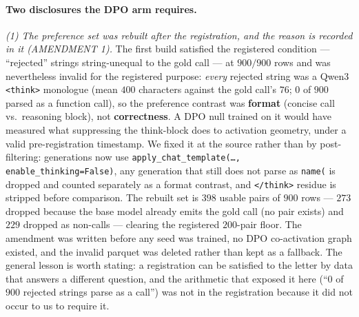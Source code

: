 \documentclass{article}
\begin{document}
\paragraph{Two disclosures the DPO arm requires.} \emph{(1) The preference set was rebuilt after the registration, and the reason is recorded in it (AMENDMENT 1).} The first build satisfied the registered condition --- ``rejected'' strings string-unequal to the gold call --- at $900/900$ rows and was nevertheless invalid for the registered purpose: \emph{every} rejected string was a Qwen3 \texttt{<think>} monologue (mean $400$ characters against the gold call's $76$; $0$ of $900$ parsed as a function call), so the preference contrast was \textbf{format} (concise call vs.\ reasoning block), not \textbf{correctness}. A DPO null trained on it would have measured what suppressing the think-block does to activation geometry, under a valid pre-registration timestamp. We fixed it at the source rather than by post-filtering: generations now use \texttt{apply\_chat\_template(\ldots, enable\_thinking=False)}, any generation that still does not parse as \texttt{name(} is dropped and counted separately as a format contrast, and \texttt{</think>} residue is stripped before comparison. The rebuilt set is $398$ usable pairs of $900$ rows --- $273$ dropped because the base model already emits the gold call (no pair exists) and $229$ dropped as non-calls --- clearing the registered $200$-pair floor. The amendment was written before any seed was trained, no DPO co-activation graph existed, and the invalid parquet was deleted rather than kept as a fallback. The general lesson is worth stating: a registration can be satisfied to the letter by data that answers a different question, and the arithmetic that exposed it here (``$0$ of $900$ rejected strings parse as a call'') was not in the registration because it did not occur to us to require it.
\end{document}
